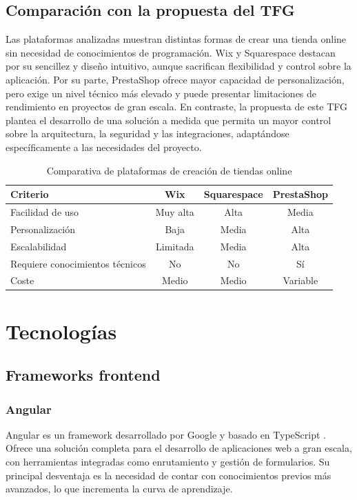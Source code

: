 \subsection{Comparación con la propuesta del TFG}
Las plataformas analizadas muestran distintas formas de crear una tienda online sin necesidad de conocimientos de programación. Wix y Squarespace destacan por su sencillez
y diseño intuitivo, aunque sacrifican flexibilidad y control sobre la aplicación. Por su parte, PrestaShop ofrece mayor capacidad de personalización, pero exige un nivel técnico más elevado y puede presentar limitaciones de rendimiento en proyectos de gran escala.
En contraste, la propuesta de este TFG plantea el desarrollo de una solución a medida  que permita un mayor control sobre la arquitectura, la seguridad y las integraciones, 
adaptándose específicamente a las necesidades del proyecto.


\begin{table}[H]
\centering
\begin{tabular}{|l|c|c|c|}
\hline
\textbf{Criterio} & \textbf{Wix} & \textbf{Squarespace} & \textbf{PrestaShop} \\ \hline
Facilidad de uso & Muy alta & Alta & Media \\ \hline
Personalización & Baja & Media & Alta \\ \hline
Escalabilidad & Limitada & Media & Alta \\ \hline
Requiere conocimientos técnicos & No & No & Sí \\ \hline
Coste & Medio & Medio & Variable \\ \hline
\end{tabular}
\caption{Comparativa de plataformas de creación de tiendas online}
\end{table}


\section{Tecnologías}

\subsection{Frameworks frontend}

\subsubsection{Angular}
Angular es un framework desarrollado por Google y basado en TypeScript \cite{angularDocs}. Ofrece una solución completa para el desarrollo de aplicaciones web a gran escala, con herramientas integradas como enrutamiento y gestión de formularios. Su principal desventaja es la necesidad de contar con conocimientos previos más avanzados, lo que incrementa la curva de aprendizaje.

